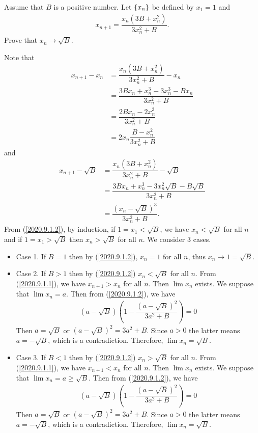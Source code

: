 \begin{problem}
Assume that $B$ is a positive number. Let $\left\{ x_n\right\}$ be defined by $x_1=1$ and 
\begin{align*}
    x_{n+1}=\dfrac{x_n(3B+x_n^2)}{3x_n^2+B}.
\end{align*}
Prove that $x_n\rightarrow \sqrt{B}.$
\begin{solution}
Note that 
\begin{align}
    x_{n+1}-x_n&=\dfrac{x_n(3B+x_n^2)}{3x_n^2+B}-x_n\nonumber\\
    &=\dfrac{3Bx_n+x_n^3-3x_n^3-Bx_n}{3x_n^2+B}\nonumber\\
    &=\dfrac{2Bx_n-2x_n^3}{3x_n^2+B}\nonumber\\
    &=2x_n\dfrac{B-x_n^2}{3x_n^2+B}\label{2020.9.1.1}
\end{align}
and 
\begin{align}
    x_{n+1}-\sqrt{B}&=\dfrac{x_n(3B+x_n^2)}{3x_n^2+B}-\sqrt{B}\nonumber\\
    &=\dfrac{3Bx_n+x_n^3-3x_n^2\sqrt{B}-B\sqrt{B}}{3x_n^2+B}\nonumber\\
    &=\dfrac{(x_n-\sqrt{B})^3}{3x_n^2+B}.\label{2020.9.1.2}
\end{align}
From (\ref{2020.9.1.2}), by induction, if $1=x_1<\sqrt{B}$, we have $x_n<\sqrt{B}$ for all $n$ and if $1=x_1>\sqrt{B}$ then $x_n>\sqrt{B}$ for all $n$. We consider 3 cases.
\begin{itemize}
    \item[]Case 1. If $B=1$ then by (\ref{2020.9.1.2}), $x_n=1$ for all $n$, thus $x_n\rightarrow 1=\sqrt{B}.$
    \item[]Case 2. If $B>1$ then by (\ref{2020.9.1.2}) $x_n<\sqrt{B}$ for all $n$. From (\ref{2020.9.1.1}), we have $x_{n+1}>x_n$ for all $n.$ Then $\lim x_n$ exists. We suppose that $\lim x_n=a.$ Then from (\ref{2020.9.1.2}), we have 
    \begin{align*}
        (a-\sqrt{B})(1-\dfrac{(a-\sqrt{B})^2}{3a^2+B})=0
    \end{align*}
    Then $a=\sqrt{B}$ or $(a-\sqrt{B})^2=3a^2+B$.  Since $a>0$ the latter means $a=-\sqrt{B}$, which is a contradiction. Therefore, $\lim x_n=\sqrt{B}.$
    \item[] Case 3. If $B<1$ then by (\ref{2020.9.1.2}) $x_n>\sqrt{B}$ for all $n$. From (\ref{2020.9.1.1}), we have $x_{n+1}<x_n$ for all $n.$ Then $\lim x_n$ exists. We suppose that $\lim x_n=a\ge \sqrt{B}.$ Then from (\ref{2020.9.1.2}), we have 
    \begin{align*}
        (a-\sqrt{B})(1-\dfrac{(a-\sqrt{B})^2}{3a^2+B})=0
    \end{align*}
    Then $a=\sqrt{B}$ or $(a-\sqrt{B})^2=3a^2+B$.  Since $a>0$ the latter means $a=-\sqrt{B}$, which is a contradiction. Therefore, $\lim x_n=\sqrt{B}.$
\end{itemize}
\end{solution}
\end{problem}

